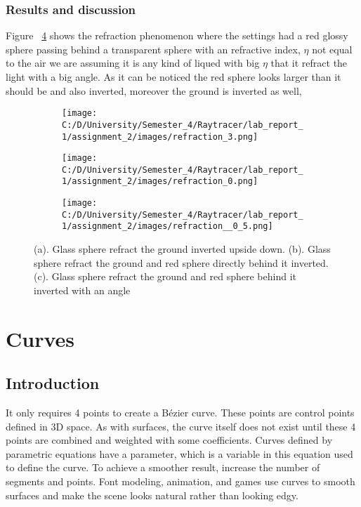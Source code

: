 \documentclass{article}
\begin{document}
	\subsubsection{Results and discussion}
	Figure ~\ref{fig:9} shows the refraction phenomenon where the settings had a red glossy sphere passing behind a transparent sphere with an refractive index, $\eta$ not equal to the air we are assuming it is any kind of liqued with big $\eta$ that it refract the light with a big angle. As it can be noticed the red sphere looks larger than it should be and also inverted, moreover the ground is inverted as well, 
	\begin{figure}[H]
		\begin{center}
			\begin{subfigure}{.3\textwidth}
				\centering
				\texttt{[image: C:/D/University/Semester\_4/Raytracer/lab\_report\_1/assignment\_2/images/refraction\_3.png]}  
				\caption{}
				\label{fig:sub-first}
			\end{subfigure}
			\begin{subfigure}{.3\textwidth}
				\centering
				\texttt{[image: C:/D/University/Semester\_4/Raytracer/lab\_report\_1/assignment\_2/images/refraction\_0.png]}  
				\caption{}
				\label{fig:sub-second}
			\end{subfigure}
			\begin{subfigure}{.3\textwidth}
				\centering
				\texttt{[image: C:/D/University/Semester\_4/Raytracer/lab\_report\_1/assignment\_2/images/refraction\_\_0\_5.png]}  
				\caption{}
				\label{fig:sub-third}
			\end{subfigure}
			
			\caption{(a). Glass sphere refract the ground inverted upside down. (b). Glass sphere refract the ground and red sphere directly behind it inverted. (c). Glass sphere refract the ground and red sphere behind it inverted with an angle}
			\label{fig:9}
		\end{center}
	\end{figure}
	\clearpage
	
	
	
	
	
	\section{Curves}
	\subsection{Introduction}
	It only requires 4 points to create a Bézier curve. These points are control points defined in 3D space. As with surfaces, the curve itself does not exist until these 4 points are combined and weighted with some coefficients. Curves defined by parametric equations have a parameter, which is a variable in this equation used to define the curve. To achieve a smoother result, increase the number of segments and points.
	Font modeling, animation, and games use curves to smooth surfaces and make the scene looks natural rather than looking edgy. 
	
\end{document}
